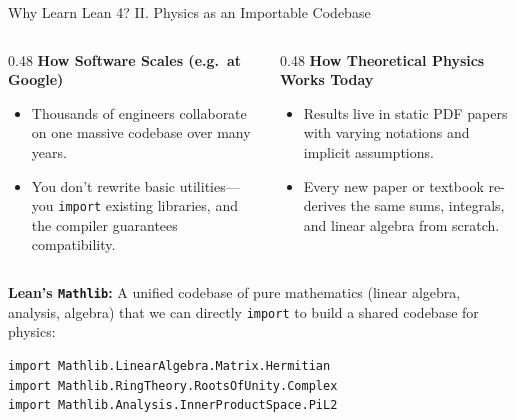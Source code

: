 \documentclass[aspectratio=169, 10pt]{beamer}
\begin{document}
\begin{frame}[fragile]{Why Learn Lean 4? II. Physics as an Importable Codebase}
  \begin{columns}[T]
    \begin{column}{0.48\textwidth}
      \textbf{How Software Scales (e.g.\ at Google)}
      \begin{itemize}
        \item Thousands of engineers collaborate on one massive codebase over many years.
        \item You don't rewrite basic utilities---you \texttt{import} existing libraries, and the compiler guarantees compatibility.
      \end{itemize}
    \end{column}

    \begin{column}{0.48\textwidth}
      \textbf{How Theoretical Physics Works Today}
      \begin{itemize}
        \item Results live in static PDF papers with varying notations and implicit assumptions.
        \item Every new paper or textbook re-derives the same sums, integrals, and linear algebra from scratch.
      \end{itemize}
    \end{column}
  \end{columns}

  \vspace{0.15cm}
  \textbf{Lean's \texttt{Mathlib}:} A unified codebase of pure mathematics (linear algebra, analysis, algebra) that we can directly \texttt{import} to build a shared codebase for physics:

\begin{lstlisting}[language=Lean4]
import Mathlib.LinearAlgebra.Matrix.Hermitian
import Mathlib.RingTheory.RootsOfUnity.Complex
import Mathlib.Analysis.InnerProductSpace.PiL2
\end{lstlisting}
\end{frame}


\end{document}

